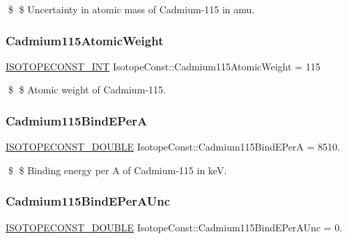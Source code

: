 \$ \$ Uncertainty in atomic mass of Cadmium-\/115 in amu. \mbox{\label{group___isotope_const-_cadmium-_cd115_ga7a3616971c02552c14ddcc5c707ee315}} 
\subsubsection{\texorpdfstring{Cadmium115\+Atomic\+Weight}{Cadmium115AtomicWeight}}
{\footnotesize\ttfamily \mbox{\hyperlink{group___isotope_const-_macros_ga5f18360b3e99483a35c32d789e62621c}{I\+S\+O\+T\+O\+P\+E\+C\+O\+N\+S\+T\+\_\+\+I\+NT}} Isotope\+Const\+::\+Cadmium115\+Atomic\+Weight = 115}

\$ \$ Atomic weight of Cadmium-\/115. \mbox{\label{group___isotope_const-_cadmium-_cd115_ga4930fa2e9869504bd6b810349b1beadf}} 
\subsubsection{\texorpdfstring{Cadmium115\+Bind\+E\+PerA}{Cadmium115BindEPerA}}
{\footnotesize\ttfamily \mbox{\hyperlink{group___isotope_const-_macros_ga8f45a7272ce02c0b4c65c44636ed719a}{I\+S\+O\+T\+O\+P\+E\+C\+O\+N\+S\+T\+\_\+\+D\+O\+U\+B\+LE}} Isotope\+Const\+::\+Cadmium115\+Bind\+E\+PerA = 8510.}

\$ \$ Binding energy per A of Cadmium-\/115 in keV. \mbox{\label{group___isotope_const-_cadmium-_cd115_ga8bdd0c0e96c72fad46d21c2210df02b6}} 
\subsubsection{\texorpdfstring{Cadmium115\+Bind\+E\+Per\+A\+Unc}{Cadmium115BindEPerAUnc}}
{\footnotesize\ttfamily \mbox{\hyperlink{group___isotope_const-_macros_ga8f45a7272ce02c0b4c65c44636ed719a}{I\+S\+O\+T\+O\+P\+E\+C\+O\+N\+S\+T\+\_\+\+D\+O\+U\+B\+LE}} Isotope\+Const\+::\+Cadmium115\+Bind\+E\+Per\+A\+Unc = 0.}

